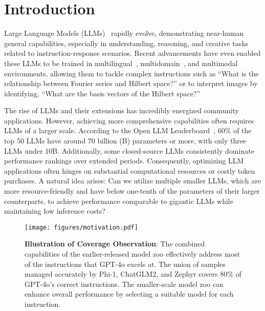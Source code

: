 \section{Introduction}
Large Language Models (LLMs)~\cite{openai2020chatgpt,du2022glm,touvron2023llama,vicuna2023,jiang2023mistral} rapidly evolve, demonstrating near-human general capabilities, especially in understanding, reasoning, and creative tasks related to instruction-response scenarios. Recent advancements have even enabled these LLMs to be trained in multilingual~\cite{yang2024qwen2technicalreport,dubey2024llama3herdmodels}, multidomain~\cite{DBLP:journals/corr/abs-2406-04614,yang2024qwen2technicalreport}, and multimodal~\cite{chen2015microsoft,chen2023sharegpt4v,reid2024gemini1_5} environments, allowing them to tackle complex instructions such as ``What is the relationship between Fourier series and Hilbert space?'' or to interpret images by identifying, ``What are the basis vectors of the Hilbert space?''

The rise of LLMs and their extensions has incredibly energized community applications. However, achieving more comprehensive capabilities often requires LLMs of a larger scale. According to the Open LLM Leaderboard~\cite{myrzakhan2024openllmleaderboard}, 60\% of the top 50 LLMs have around 70 billion (B) parameters or more, with only three LLMs under 10B. Additionally, some closed-source LLMs consistently dominate performance rankings over extended periods.
Consequently, optimizing LLM applications often hinges on substantial computational resources or costly token purchases.
A natural idea arises: Can we utilize multiple smaller LLMs, which are more resource-friendly and have below one-tenth of the parameters of their larger counterparts, to achieve performance comparable to gigantic LLMs while maintaining low inference costs?

\begin{figure}[t]
    \centering
    \vspace{-10pt}
    \texttt{[image: figures/motivation.pdf]}
    \caption{\textbf{Illustration of Coverage Observation}: The combined capabilities of the earlier-released model zoo effectively address most of the instructions that GPT-4o excels at. The union of samples managed accurately by Phi-1, ChatGLM2, and Zephyr covers 80\% of GPT-4o's correct instructions. The smaller-scale model zoo can enhance overall performance by selecting a suitable model for each instruction.}
    \label{fig:motivation}
    \vspace{-13pt}
\end{figure}

